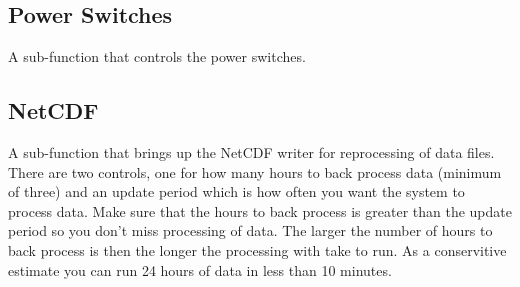 \subsection{Power Switches}\label{Sec:PowSwitchSubFunction}

A sub-function that controls the power switches.

\subsection{NetCDF}\label{Sec:NetCDFSubFunction}

A sub-function that brings up the NetCDF writer for reprocessing of data files. There are two controls, one for how many hours to back process data (minimum of three) and an update period which is how often you want the system to process data. Make sure that the hours to back process is greater than the update period so you don't miss processing of data. The larger the number of hours to back process is then the longer the processing with take to run. As a conservitive estimate you can run 24 hours of data in less than 10 minutes. 

\newpage 
